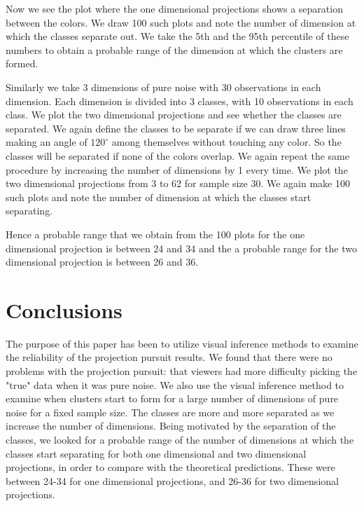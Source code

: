\documentclass[12]{report}
\begin{document}
 
Now we see the plot where the one dimensional projections shows a separation between the colors. We draw 100 such plots and note the number of dimension at which the classes separate out. We take the 5th and the 95th percentile of these numbers to obtain a probable range of the dimension at which the clusters are formed.

Similarly we take 3 dimensions of pure noise with 30 observations in each dimension. Each dimension is divided into 3 classes, with 10 observations in each class. We plot the two dimensional projections and see whether the classes are separated. We again define the classes to be separate if we can draw three lines making an angle of $120^{\circ}$ among themselves without touching any color. So the classes will be separated if none of the colors overlap. We again repeat the same procedure by increasing the number of dimensions by 1 every time. We plot the two dimensional projections from 3 to 62 for sample size 30. We again make 100 such plots and note the number of dimension at which the classes start separating. 


Hence a probable range that we obtain from the 100 plots for the one dimensional projection is between 24 and 34 and the a probable range for the two dimensional projection is between 26 and 36. 

\section{Conclusions}

The purpose of this paper has been to utilize  visual inference methods to examine the reliability of the projection pursuit results. We found that there were no problems with the projection pursuit: that viewers had more difficulty picking the "true" data when it was pure noise. We also use the visual inference method to examine when clusters start to form for a large number of dimensions of pure noise for a fixed sample size. The classes are more and more separated as we increase the number of dimensions. Being motivated by the separation of the classes, we looked for a probable range of the number of dimensions at which the classes start separating for both one dimensional and two dimensional projections, in order to compare with the theoretical predictions. These were between 24-34 for one dimensional projections, and 26-36 for two dimensional projections.
\end{document}
